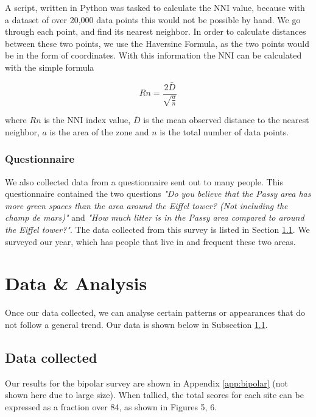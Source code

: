 \documentclass[11pt,letterpaper]{article}
\begin{document}
A script, written in Python was tasked to calculate the NNI value, because with a dataset of over 20,000 data points this would not be possible by hand. We go through each point, and find its nearest neighbor. In order to calculate distances between these two points, we use the Haversine Formula, as the two points would be in the form of coordinates. With this information the NNI can be calculated with the simple formula

$$Rn = \frac{2 \bar D}{\sqrt{\frac{a}{n}}}$$

where $Rn$ is the NNI index value, $\bar D$ is the mean observed distance to the nearest neighbor, $a$ is the area of the zone and $n$ is the total number of data points.

\subsubsection{Questionnaire}

We also collected data from a questionnaire sent out to many people. This questionnaire contained the two questions \textit{"Do you believe that the Passy area has more green spaces than the area around the Eiffel tower? (Not including the champ de mars)"} and \textit{"How much litter is in the Passy area compared to around the Eiffel tower?"}. The data collected from this survey is listed in Section \ref{sec:data}. We surveyed our year, which has people that live in and frequent these two areas.


\section{Data \& Analysis}
\label{sec:analysis}

Once our data collected, we can analyse certain patterns or appearances that do not follow a general trend. Our data is shown below in Subsection \ref{sec:data}.

\subsection{Data collected}
\label{sec:data}

Our results for the bipolar survey are shown in Appendix \ref{app:bipolar} (not shown here due to large size). When tallied, the total scores for each site can be expressed as a fraction over 84, as shown in Figures 5, 6.
\end{document}
